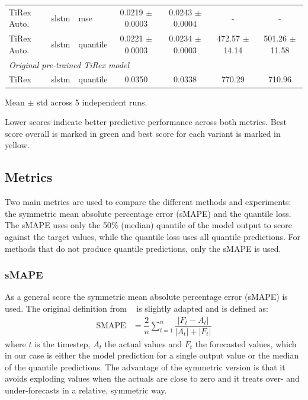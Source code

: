 \documentclass[a4paper,oneside,10pt,ngerman,english]{scrartcl}
\begin{document}
\begin{table}[htbp]
\begin{threeparttable}
\begin{tabular}{lllcccc}
			TiRex Auto. & slstm & mse     & \cellcolor[HTML]{fdfebc}0.0219 $\pm$ 0.0003 & 0.0243 $\pm$ 0.0004 & - & - \\
			TiRex Auto. & slstm & quantile & \cellcolor[HTML]{fdfebc}0.0221 $\pm$ 0.0003 & 0.0234 $\pm$ 0.0003 & 472.57 $\pm$ 14.14 & 501.26 $\pm$ 11.58 \\			
			\midrule
			\multicolumn{7}{l}{{\small \emph{Original pre-trained TiRex model}}}\\
			TiRex & slstm & quantile  & 0.0350 & \cellcolor[HTML]{fdfebc}0.0338 & 770.29  &  710.96  \\
			\bottomrule
		\end{tabular}
		\begin{tablenotes}
			\small
			\item[a] Mean $\pm$ std across 5 independent runs.
			\item[b] Lower scores indicate better predictive performance across both metrics. Best score overall is marked in green and best score for each variant is marked in yellow.
		\end{tablenotes}	
	\end{threeparttable}
\end{table}


\subsection{Metrics}
\label{sec:metrics}

Two main metrics are used to compare the different methods and experiments: the symmetric mean absolute percentage error (sMAPE) and the quantile loss. The sMAPE uses only the 50\% (median) quantile of the model output to score against the target values, while the quantile loss uses all quantile predictions. For methods that do not produce quantile predictions, only the sMAPE is used.

\subsubsection{sMAPE}
\label{sec:smape}
As a general score the symmetric mean absolute percentage error (sMAPE) is used. The original definition from \citeauthor{armstrong1985long}~\cite{armstrong1985long} is slightly adapted and is defined as:
\begin{align}
	\text{SMAPE} &= \dfrac{2}{n} \sum_{t=1}^{n} \dfrac{|F_t - A_t|}{|A_t| + |F_t|}
	\label{eq:smape}
\end{align}
where $t$ is the timestep, $A_t$ the actual values and $F_t$ the forecasted values, which in our case is either the model prediction for a single output value or the median of the quantile predictions. The advantage of the symmetric version is that it avoids exploding values when the actuals are close to zero and it treats over- and under-forecasts in a relative, symmetric way.
\end{document}
